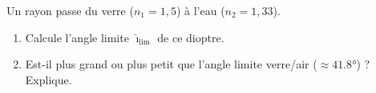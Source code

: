 \documentclass[11pt,a4paper]{article}
\begin{document}
\begin{exo}
Un rayon passe du verre ($n_1=1{,}5$) à l'eau ($n_2=1{,}33$).
\begin{enumerate}[label=\alph*)]
  \item Calcule l'angle limite $\hat{\imath}_{\text{lim}}$ de ce dioptre.
  \item Est-il plus grand ou plus petit que l'angle limite verre/air ($\approx\ang{41.8}$) ? Explique.
\end{enumerate}
\end{exo}
\end{document}
